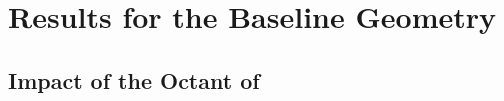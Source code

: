 \section{Results for the Baseline Geometry}
\label{sec:results_baseline}



\subsection{Impact of the Octant of }
\label{sec:results_octant}